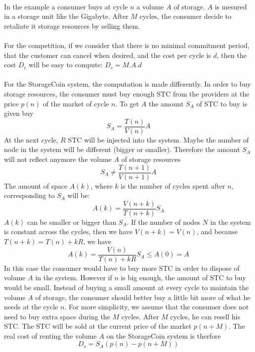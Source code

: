 \documentclass[a4paper,12pt]{article}
\begin{document}
\paragraph*{}
In the example a consumer buys at cycle $n$ a volume $A$ of storage. $A$ is mesured in a storage unit like the Gigabyte. After $M$ cycles, the consumer decide to retaliate it storage resources by selling them.

\paragraph*{}
For the competition, if we consider that there is no minimal commitment period, that the customer can cancel when desired, and the cost per cycle is $d$, then the cost $D_{c}$ will be easy to compute: $D_{c}=M.A.d$

\paragraph*{}
For the StorageCoin system, the computation is made differently. In order to buy storage resources, the consumer must buy enough STC from the providers at the price $p(n)$ of the market of cycle $n$.
To get $A$ the amount $S_{A}$ of STC to buy is given buy 
\[S_{A}=\frac{T(n)}{V(n)}A\]
At the next cycle, $R$ STC will be injected into the system. Maybe the number of node in the system will be different (bigger or smaller). 
Therefore the amount $S_{A}$ will not reflect anymore the volume $A$ of storage resources 
\[S_{A}\neq \frac{T(n+1)}{V(n+1)}A\]
The amount of space $A(k)$, where $k$ is the number of cycles spent after $n$, corresponding to $S_{A}$ will be: 
\[A(k)=\frac{V(n+k)}{T(n+k)}S_{A}\]
$A(k)$ can be smaller or bigger than $S_{A}$. If the number of nodes $N$ in the system is constant across the cycles, then we have $V(n+k)=V(n)$, and because $T(n+k)=T(n)+kR$, we have
\[A(k)=\frac{V(n)}{T(n)+kR}S_{A}\le A(0)=A\]
In this case the consumer would have to buy more STC in order to dispose of volume $A$ in the system.
However if $n$ is big enough, the amount of STC to buy would be small.
Instead of buying a small amount at every cycle to maintain the volume $A$ of storage, the consumer should better buy a little bit more of what he needs at the cycle $n$.
For more simplicity, we assume that the consumer does not need to buy extra space during the $M$ cycles.
After $M$ cycles, he can resell his STC. The STC will be sold at the current price of the market $p(n + M)$.
The real cost of renting the volume $A$ on the StorageCoin system is therfore
\[D_{s}=S_{A}(p(n)-p(n+M))\]
\end{document}
